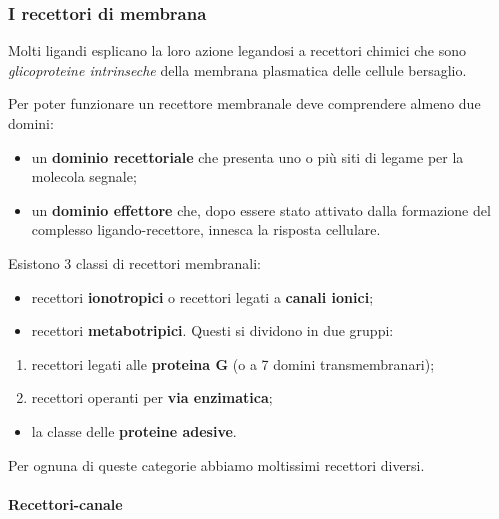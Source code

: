 \documentclass[]{article}
\begin{document}
\subsubsection{I recettori di membrana}\label{i-recettori-di-membrana}

Molti ligandi esplicano la loro azione legandosi a recettori chimici che
sono \emph{glicoproteine intrinseche} della membrana plasmatica delle
cellule bersaglio.

Per poter funzionare un recettore membranale deve comprendere almeno due
domini:

\begin{itemize}
\itemsep1pt\parskip0pt
\item
  un \textbf{dominio recettoriale} che presenta uno o più siti di legame
  per la molecola segnale;
\item
  un \textbf{dominio effettore} che, dopo essere stato attivato dalla
  formazione del complesso ligando-recettore, innesca la risposta
  cellulare.
\end{itemize}

Esistono 3 classi di recettori membranali:

\begin{itemize}
\itemsep1pt\parskip0pt
\item
  recettori \textbf{ionotropici} o recettori legati a \textbf{canali
  ionici};
\item
  recettori \textbf{metabotripici}. Questi si dividono in due gruppi:
\end{itemize}

\begin{enumerate}
\def\labelenumi{\arabic{enumi}.}
\itemsep1pt\parskip0pt
\item
  recettori legati alle \textbf{proteina G} (o a 7 domini
  transmembranari);
\item
  recettori operanti per \textbf{via enzimatica};
\end{enumerate}

\begin{itemize}
\itemsep1pt\parskip0pt
\item
  la classe delle \textbf{proteine adesive}.
\end{itemize}

Per ognuna di queste categorie abbiamo moltissimi recettori diversi.

\paragraph{Recettori-canale}\label{recettori-canale}
\end{document}
